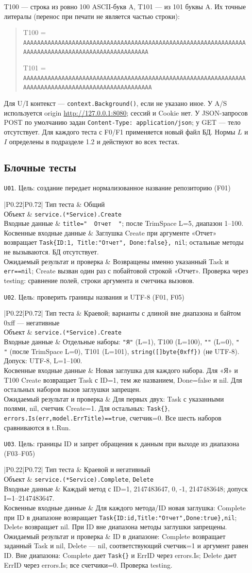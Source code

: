 \documentclass[12pt,a4paper]{extarticle}
\newcommand{\code}[1]{\nolinkurl{#1}}
\newcommand{\rucode}[1]{\texttt{#1}}
\newcommand{\testcase}[6]{%
  \par\addvspace{12pt}\noindent #1\par\nopagebreak
  \begin{longtable}{|P{0.22\textwidth}|P{0.72\textwidth}|}
  \hline
  Тип теста & #2 \\ \hline
  Объект & #3 \\ \hline
  Входные данные & #4 \\ \hline
  Косвенные входные данные & #5 \\ \hline
  Ожидаемый результат и проверка & #6 \\ \hline
  \end{longtable}}
\begin{document}
T100 --- строка из ровно 100 ASCII-букв A, T101 --- из 101 буквы A.
Их точные литералы (перенос при печати не является частью строки):
\begin{quote}\raggedright
T100 = \code{AAAAAAAAAAAAAAAAAAAAAAAAAAAAAAAAAAAAAAAAAAAAAAAAAAAAAAAAAAAAAAAAAAAAAAAAAAAAAAAAAAAAAAAAAAAAAAAAAAAA}\par
T101 = \code{AAAAAAAAAAAAAAAAAAAAAAAAAAAAAAAAAAAAAAAAAAAAAAAAAAAAAAAAAAAAAAAAAAAAAAAAAAAAAAAAAAAAAAAAAAAAAAAAAAAAA}
\end{quote}
Для U/I контекст --- \code{context.Background()}, если не указано иное.
У A/S используется origin \url{http://127.0.0.1:8080};
сессий и Cookie нет. У JSON-запросов POST по умолчанию задан
\code{Content-Type: application/json}; у GET --- тело отсутствует.
Для каждого теста с F0/F1 применяется новый файл БД.
Нормы $L$ и $I$ определены в подразделе 1.2 и действуют во всех тестах.

\subsection{Блочные тесты}
\testcase{\texttt{U01}. Цель: создание передает нормализованное название репозиторию (F01)}
{Общий}
{\code{service.(*Service).Create}}
{\rucode{title="\ \ Отчет\ \ "}; после TrimSpace L=5, диапазон 1--100.}
{Заглушка Create при аргументе «Отчет» возвращает
\rucode{Task\{ID:1,\allowbreak{} Title:"Отчет",\allowbreak{} Done:false\},\allowbreak{} nil}; остальные методы
не вызываются. БД отсутствует.}
{Возвращены именно указанный Task и \code{err==nil}; Create вызван
один раз с побайтовой строкой «Отчет». Проверка через testing:
сравнение полей, строки аргумента и счетчика вызовов.}

\testcase{\texttt{U02}. Цель: проверить границы названия и UTF-8 (F01, F05)}
{Краевой; варианты с длиной вне диапазона и байтом 0xff --- негативные}
{\code{service.(*Service).Create}}
{Отдельные наборы: \rucode{"Я"} (L=1), T100 (L=100),
\code{""} (L=0), \code{"   "} (после TrimSpace L=0), T101 (L=101),
\rucode{string([]byte\{0xff\})} (не UTF-8). Допуск: UTF-8, L=1--100.}
{Новая заглушка для каждого набора. Для «Я» и T100 Create возвращает
Task с ID=1, тем же названием, Done=false и nil.
Для остальных наборов вызов заглушки запрещен.}
{Для первых двух: Task с указанными полями, nil, счетчик Create=1.
Для остальных: \rucode{Task\{\}}, \code{errors.Is(err,model.ErrTitle)==true},
счетчик=0. Все шесть наборов сравниваются в t.Run.}

\testcase{\texttt{U03}. Цель: границы ID и запрет обращения к данным при выходе из диапазона (F03--F05)}
{Краевой и негативный}
{\code{service.(*Service).Complete}, \code{Delete}}
{Каждый метод с ID=1, 2147483647, 0, -1, 2147483648;
допуск I=1--2147483647.}
{Для каждого метода/ID новая заглушка: Complete при ID в диапазоне
возвращает \rucode{Task\{ID:id,\allowbreak{}Title:"Отчет",\allowbreak{}Done:true\},\allowbreak{}nil};
Delete возвращает nil. При ID вне диапазона методы заглушки запрещены.}
{ID в диапазоне: Complete возвращает заданный Task и nil,
Delete --- nil, соответствующий счетчик=1 и аргумент равен ID.
Вне диапазона: Complete дает \rucode{Task\{\}} и ErrID через errors.Is;
Delete дает ErrID через errors.Is; все счетчики=0. Проверка testing.}
\end{document}
